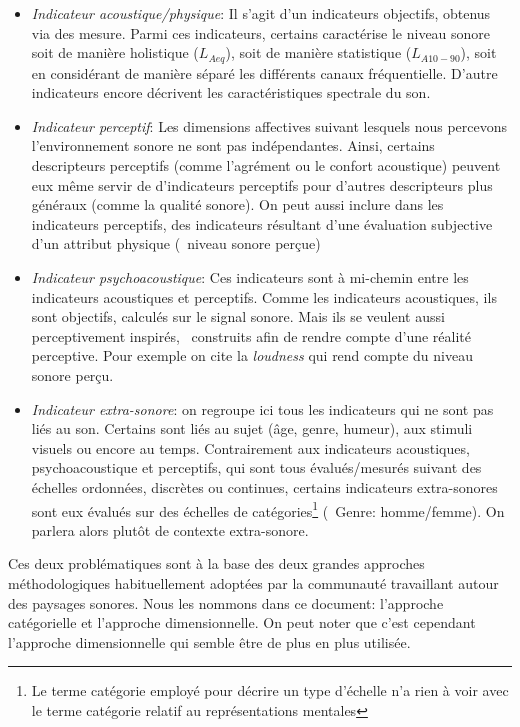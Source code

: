 \begin{itemize}
\begin{itemize}
\item \emph{Indicateur acoustique/physique}: Il s'agit d'un indicateurs objectifs, obtenus via des mesure. Parmi ces indicateurs, certains caractérise le niveau sonore soit de manière holistique ($L_{Aeq}$), soit de manière statistique ($L_{A10-90}$), soit en considérant de manière séparé les différents canaux fréquentielle. D'autre indicateurs encore décrivent les caractéristiques spectrale du son.
\item \emph{Indicateur perceptif}: Les dimensions affectives suivant lesquels nous percevons l'environnement sonore ne sont pas indépendantes. Ainsi, certains descripteurs perceptifs (comme l'agrément ou le confort acoustique) peuvent eux même servir de d'indicateurs perceptifs pour d'autres descripteurs plus généraux (comme la qualité sonore). On peut aussi inclure dans les indicateurs perceptifs, des indicateurs résultant d'une évaluation subjective d'un attribut physique (\eg~niveau sonore perçue) 
\item \emph{Indicateur psychoacoustique}: Ces indicateurs sont à mi-chemin entre les indicateurs acoustiques et perceptifs. Comme les indicateurs acoustiques, ils sont objectifs, calculés sur le signal sonore. Mais ils se veulent aussi perceptivement inspirés, \ie~construits afin de rendre compte d'une réalité perceptive. Pour exemple on cite la \emph{loudness} qui rend compte du niveau sonore perçu.
\item \emph{Indicateur extra-sonore}: on regroupe ici tous les indicateurs qui ne sont pas liés au son. Certains sont liés au sujet (âge, genre, humeur), aux stimuli visuels ou encore au temps. Contrairement aux indicateurs acoustiques, psychoacoustique et perceptifs, qui sont tous évalués/mesurés suivant des échelles ordonnées, discrètes ou continues, certains indicateurs extra-sonores sont eux évalués sur des échelles de catégories\footnote{Le terme catégorie employé pour décrire un type d'échelle n'a rien à voir avec le terme catégorie relatif au représentations mentales} (\eg~Genre: homme/femme). On parlera alors plutôt de contexte extra-sonore.
\end{itemize}

\end{itemize}

Ces deux problématiques sont à la base des deux grandes approches  méthodologiques habituellement adoptées par la communauté travaillant autour des paysages sonores. Nous les nommons dans ce document: l'approche catégorielle et l'approche dimensionnelle.
On peut noter que c'est cependant l'approche dimensionnelle qui semble être de plus en plus utilisée.

